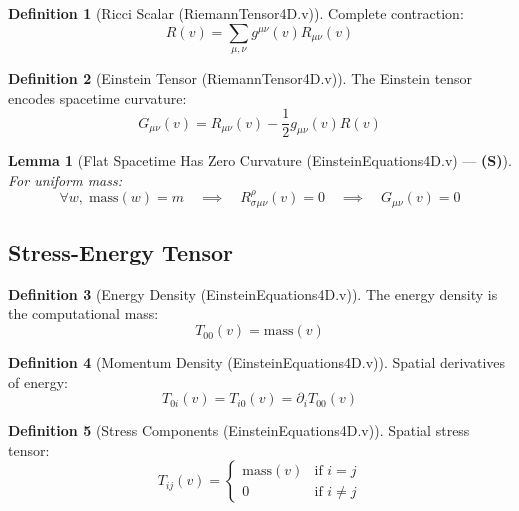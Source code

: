 \documentclass[11pt, a4paper]{report}
\theoremstyle{definition}
\newtheorem{definition}{Definition}[chapter]
\theoremstyle{plain}
\newtheorem{lemma}[theorem]{Lemma}
\begin{document}
\begin{definition}[Ricci Scalar {\normalfont (RiemannTensor4D.v)}]
Complete contraction:
\begin{equation}
R(v) = \sum_{\mu,\nu} g^{\mu\nu}(v) R_{\mu\nu}(v)
\end{equation}
\end{definition}

\begin{definition}[Einstein Tensor {\normalfont (RiemannTensor4D.v)}]
The Einstein tensor encodes spacetime curvature:
\begin{equation}
G_{\mu\nu}(v) = R_{\mu\nu}(v) - \frac{1}{2} g_{\mu\nu}(v) R(v)
\end{equation}
\end{definition}

\begin{lemma}[Flat Spacetime Has Zero Curvature {\normalfont (EinsteinEquations4D.v)} --- \textbf{(S)}]
For uniform mass:
\begin{equation}
\forall w,\; \text{mass}(w) = m \quad \implies \quad R^\rho_{\sigma\mu\nu}(v) = 0 \quad \implies \quad G_{\mu\nu}(v) = 0
\end{equation}
\end{lemma}

\subsection{Stress-Energy Tensor}

\begin{definition}[Energy Density {\normalfont (EinsteinEquations4D.v)}]
The energy density is the computational mass:
\begin{equation}
T_{00}(v) = \text{mass}(v)
\end{equation}
\end{definition}

\begin{definition}[Momentum Density {\normalfont (EinsteinEquations4D.v)}]
Spatial derivatives of energy:
\begin{equation}
T_{0i}(v) = T_{i0}(v) = \partial_i T_{00}(v)
\end{equation}
\end{definition}

\begin{definition}[Stress Components {\normalfont (EinsteinEquations4D.v)}]
Spatial stress tensor:
\begin{equation}
T_{ij}(v) = \begin{cases}
\text{mass}(v) & \text{if } i = j \\
0 & \text{if } i \neq j
\end{cases}
\end{equation}
\end{definition}
\end{document}
